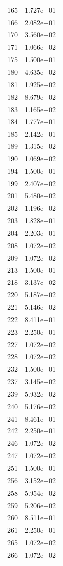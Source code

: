 \documentclass[12pt]{article}
\begin{document}
\begin{longtable}{@{}cc@{}}
165 & 1.727e+01 \\
166 & 2.082e+01 \\
170 & 3.560e+02 \\
171 & 1.066e+02 \\
175 & 1.500e+01 \\
180 & 4.635e+02 \\
181 & 1.925e+02 \\
182 & 8.679e+02 \\
183 & 1.165e+02 \\
184 & 1.777e+01 \\
185 & 2.142e+01 \\
189 & 1.315e+02 \\
190 & 1.069e+02 \\
194 & 1.500e+01 \\
199 & 2.407e+02 \\
201 & 5.480e+02 \\
202 & 1.196e+02 \\
203 & 1.828e+01 \\
204 & 2.203e+01 \\
208 & 1.072e+02 \\
209 & 1.072e+02 \\
213 & 1.500e+01 \\
218 & 3.137e+02 \\
220 & 5.187e+02 \\
221 & 5.146e+02 \\
222 & 8.411e+01 \\
223 & 2.250e+01 \\
227 & 1.072e+02 \\
228 & 1.072e+02 \\
232 & 1.500e+01 \\
237 & 3.145e+02 \\
239 & 5.932e+02 \\
240 & 5.176e+02 \\
241 & 8.461e+01 \\
242 & 2.250e+01 \\
246 & 1.072e+02 \\
247 & 1.072e+02 \\
251 & 1.500e+01 \\
256 & 3.152e+02 \\
258 & 5.954e+02 \\
259 & 5.206e+02 \\
260 & 8.511e+01 \\
261 & 2.250e+01 \\
265 & 1.072e+02 \\
266 & 1.072e+02 \\

\end{longtable}
\end{document}
